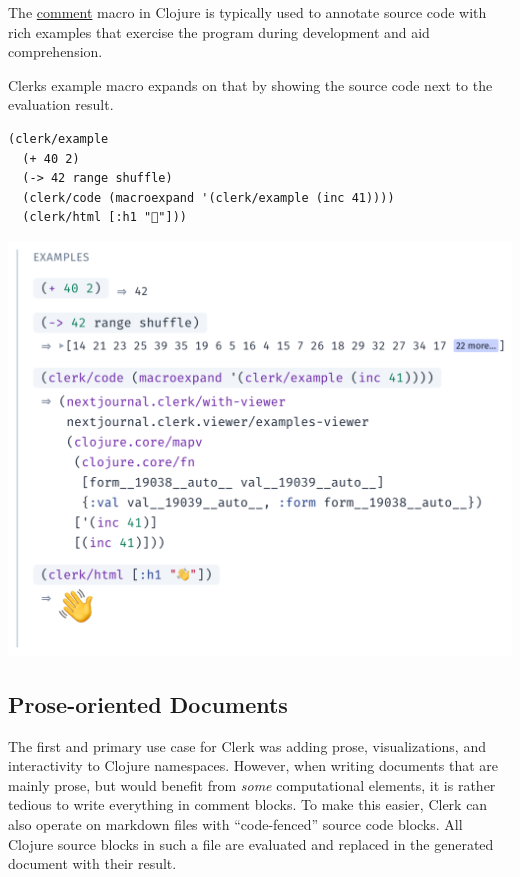 \documentclass[sigconf,screen]{acmart}
\begin{document}
The \href{https://clojuredocs.org/clojure.core/comment}{comment} macro in Clojure is typically used to annotate source code with rich examples that exercise the program during development and aid comprehension.

Clerk\textquotesingle s example macro expands on that by showing the source code next to the evaluation result.

\begin{minipage}{\linewidth}
\begin{lstlisting}
(clerk/example
  (+ 40 2)
  (-> 42 range shuffle)
  (clerk/code (macroexpand '(clerk/example (inc 41))))
  (clerk/html [:h1 "👋"]))
\end{lstlisting}
\end{minipage}

\includegraphics{images/anon-expr-5dtPQwixfSw57U4Tdiwqwrsj2tVHu1-result.png}

\hypertarget{prose-oriented-documents}{%
\subsection{Prose-oriented Documents}\label{prose-oriented-documents}}

The first and primary use case for Clerk was adding prose, visualizations, and interactivity to Clojure namespaces. However, when writing documents that are mainly prose, but would benefit from \emph{some} computational elements, it is rather tedious to write everything in comment blocks. To make this easier, Clerk can also operate on markdown files with ``code-fenced'' source code blocks. All Clojure source blocks in such a file are evaluated and replaced in the generated document with their result.
\end{document}
